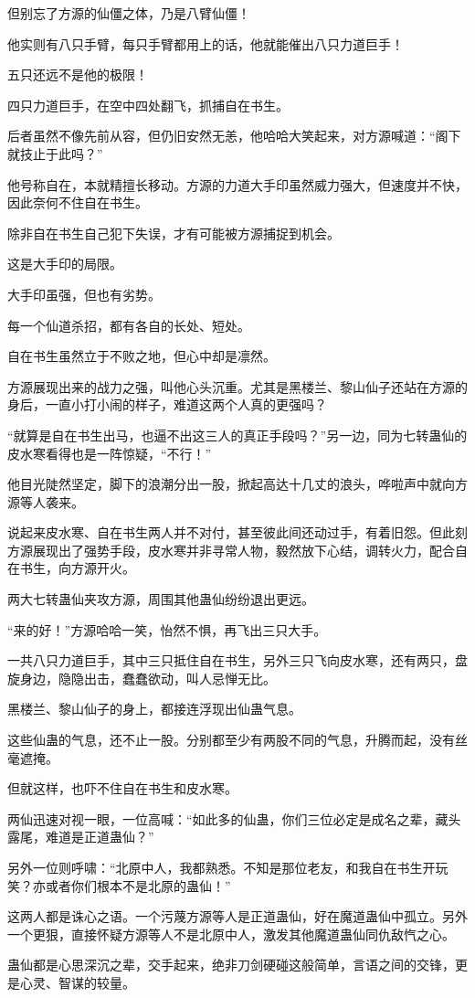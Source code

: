 \begin{this_body}
但别忘了方源的仙僵之体，乃是八臂仙僵！

他实则有八只手臂，每只手臂都用上的话，他就能催出八只力道巨手！

五只还远不是他的极限！

四只力道巨手，在空中四处翻飞，抓捕自在书生。

后者虽然不像先前从容，但仍旧安然无恙，他哈哈大笑起来，对方源喊道：“阁下就技止于此吗？”

他号称自在，本就精擅长移动。方源的力道大手印虽然威力强大，但速度并不快，因此奈何不住自在书生。

除非自在书生自己犯下失误，才有可能被方源捕捉到机会。

这是大手印的局限。

大手印虽强，但也有劣势。

每一个仙道杀招，都有各自的长处、短处。

自在书生虽然立于不败之地，但心中却是凛然。

方源展现出来的战力之强，叫他心头沉重。尤其是黑楼兰、黎山仙子还站在方源的身后，一直小打小闹的样子，难道这两个人真的更强吗？

“就算是自在书生出马，也逼不出这三人的真正手段吗？”另一边，同为七转蛊仙的皮水寒看得也是一阵惊疑，“不行！”

他目光陡然坚定，脚下的浪潮分出一股，掀起高达十几丈的浪头，哗啦声中就向方源等人袭来。

说起来皮水寒、自在书生两人并不对付，甚至彼此间还动过手，有着旧怨。但此刻方源展现出了强势手段，皮水寒并非寻常人物，毅然放下心结，调转火力，配合自在书生，向方源开火。

两大七转蛊仙夹攻方源，周围其他蛊仙纷纷退出更远。

“来的好！”方源哈哈一笑，怡然不惧，再飞出三只大手。

一共八只力道巨手，其中三只抵住自在书生，另外三只飞向皮水寒，还有两只，盘旋身边，隐隐出击，蠢蠢欲动，叫人忌惮无比。

黑楼兰、黎山仙子的身上，都接连浮现出仙蛊气息。

这些仙蛊的气息，还不止一股。分别都至少有两股不同的气息，升腾而起，没有丝毫遮掩。

但就这样，也吓不住自在书生和皮水寒。

两仙迅速对视一眼，一位高喊：“如此多的仙蛊，你们三位必定是成名之辈，藏头露尾，难道是正道蛊仙？”

另外一位则呼啸：“北原中人，我都熟悉。不知是那位老友，和我自在书生开玩笑？亦或者你们根本不是北原的蛊仙！”

这两人都是诛心之语。一个污蔑方源等人是正道蛊仙，好在魔道蛊仙中孤立。另外一个更狠，直接怀疑方源等人不是北原中人，激发其他魔道蛊仙同仇敌忾之心。

蛊仙都是心思深沉之辈，交手起来，绝非刀剑硬碰这般简单，言语之间的交锋，更是心灵、智谋的较量。

\end{this_body}

